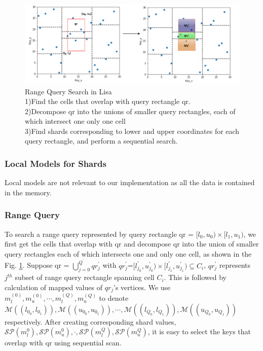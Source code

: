 \begin{figure}[t]
    \centering
    \includegraphics[width=1\textwidth]{graphs/range_query_lisa.png}
    \caption{Range Query Search in Lisa\\
    1)Find the cells that overlap with query rectangle qr.\\
    2)Decompose qr into the unions of smaller query rectangles, each of which intersect one only one cell \\
    3)Find shards corresponding to lower and upper coordinates for each query rectangle, and perform a sequential search. }
    \label{fig:Range_Query_Lisa}
\end{figure}
\subsubsection{Local Models for Shards}
Local models are not relevant to our implementation as all the data is contained in the memory.  

\subsubsection{Range Query}
To search a range query represented by query rectangle qr = $[l_{0},u_{0})\times[l_{1},u_{1})$, we first get the cells that overlap with qr and decompose qr
into the union of smaller query rectangles each of which
intersects one and only one cell, as shown in the Fig. \ref{fig:Range_Query_Lisa}. Suppose qr = $\bigcup\limits_{j=0}^{Q^{'}}qr_{j}^{'}$ with $qr_{j}^{'}$=$[l_{j_0}^{'},u_{j_0}^{'})\times[l_{j_1}^{'},u_{j_1}^{'}) \subseteq C_{i}$, $qr_{j}^{'}$ represents $j^{th}$ subset of range query rectangle spanning cell $C_{i}$. This is followed by calculation of mapped values of 
$qr_{j}$'s vertices. We use $m_{l}^{(0)}, m_{u}^{(0)},\cdots,m_{l}^{(Q)}, m_{u}^{(Q)}$ to denote $\mathcal{M}((l_{0_0},l_{0_1} )), \mathcal{M}((u_{0_0},u_{0_1} )), \cdots, \mathcal{M}((l_{Q_0},l_{Q_1} )), \mathcal{M}((u_{Q_0},u_{Q_1} ))$ respectively. After creating corresponding shard values,  $\mathcal{SP}(m_{l}^{0}), \mathcal{SP}(m_{u}^{0}), \cdot, \mathcal{SP}(m_{l}^{Q}), \mathcal{SP}(m_{u}^{Q})$, it is easy to select the keys that overlap with qr using sequential scan.



